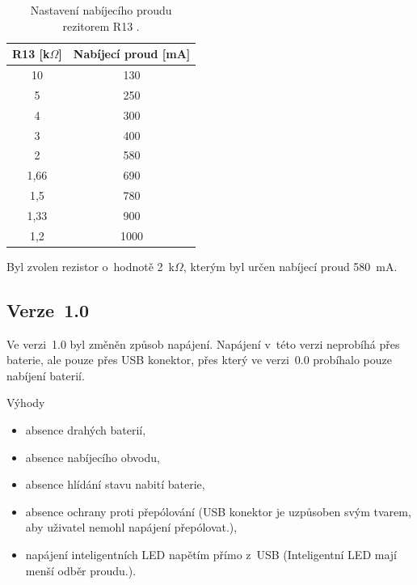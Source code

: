   \begin{table}[!h]
    \caption{Nastavení nabíjecího proudu rezitorem R13 \cite{TP4056_datasheet}.}
    \begin{center}
      \begin{tabular}{|c|c|}
          \hline
          R13 [k$\Omega$] & Nabíjecí proud [mA] \\
          \hline
          10      & 130 \\
          \hline
          5       & 250 \\
          \hline
          4       & 300 \\
          \hline
          3       & 400 \\
          \hline
          2       & 580 \\
          \hline
          1,66    & 690 \\
          \hline
          1,5     & 780 \\
          \hline
          1,33    & 900 \\
          \hline
          1,2     & 1000 \\
          \hline
      \end{tabular}  
    \end{center}
  \end{table}

  Byl zvolen rezistor o~hodnotě 2~k$\Omega$, kterým byl určen nabíjecí proud 580~mA. 

  \subsection{Verze~1.0}
  Ve verzi~1.0 byl změněn způsob napájení. Napájení v~této verzi neprobíhá přes baterie, ale pouze přes USB konektor, přes 
  který ve verzi~0.0 probíhalo pouze nabíjení baterií. 

  Výhody
  \begin{itemize}
    \item absence drahých baterií,
    \item absence nabíjecího obvodu,
    \item absence hlídání stavu nabití baterie,
    \item absence ochrany proti přepólování (USB konektor je uzpůsoben svým tvarem, aby uživatel nemohl napájení přepólovat.),
    \item napájení inteligentních LED napětím přímo z~USB (Inteligentní LED mají menší odběr proudu.).
  \end{itemize}

